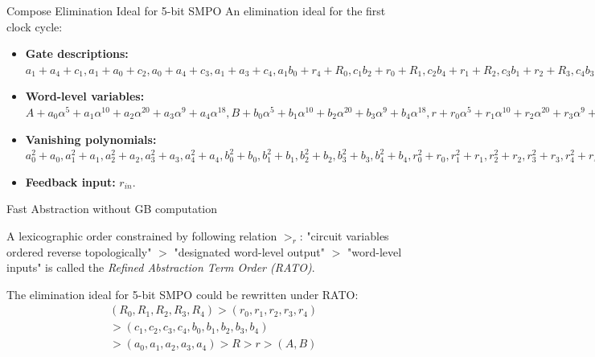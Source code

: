 \documentclass[xcolor=dvipsnames]{beamer}
\begin{document}
\begin{frame}{\large{Compose Elimination Ideal for 5-bit SMPO}}
An elimination ideal for the first clock cycle:
\begin{itemize}
\item {\bf Gate descriptions:}
$a_1+a_4+c_1, a_1+a_0+c_2, a_0+a_4+c_3, a_1+a_3+c_4,
		  a_1b_0+r_4+R_0, c_1b_2+r_0+R_1, c_2b_4+r_1+R_2, c_3b_1+r_2+R_3, c_4b_3+r_3+R_4;$
		  
\item {\bf Word-level variables:}
$A+a_0\alpha^5+a_1\alpha^{10}+a_2\alpha^{20}+a_3\alpha^9+a_4\alpha^{18},
		  B+b_0\alpha^5+b_1\alpha^{10}+b_2\alpha^{20}+b_3\alpha^9+b_4\alpha^{18},
		  r+r_0\alpha^5+r_1\alpha^{10}+r_2\alpha^{20}+r_3\alpha^9+r_4\alpha^{18},
		  R+R_0\alpha^5+R_1\alpha^{10}+R_2\alpha^{20}+R_3\alpha^9+R_4\alpha^{18};$
		  
\item {\bf Vanishing polynomials:}
		 $ a_0^2+a_0, a_1^2+a_1, a_2^2+a_2, a_3^2+a_3, a_4^2+a_4,
		  b_0^2+b_0, b_1^2+b_1, b_2^2+b_2, b_3^2+b_3, b_4^2+b_4,
		  r_0^2+r_0, r_1^2+r_1, r_2^2+r_2, r_3^2+r_3, r_4^2+r_4,
		  R_0^2+R_0, R_1^2+R_1, R_2^2+R_2, R_3^2+R_3, R_4^2+R_4,
		  c_1^2+c_1, c_2^2+c_2, c_3^2+c_3, c_4^2+c_4,
		  A^{32}+A, B^{32}+B, r^{32}+r, R^{32}+R;$
		  
\item	{\bf Feedback input:}	  $r_{in}$.
\end{itemize}
\end{frame}

\begin{frame}{\large{Fast Abstraction without GB computation}}
\begin{Definition}
A lexicographic order constrained by following relation $>_{r}$: "circuit variables ordered reverse topologically" $>$ 
"designated word-level output" $>$ "word-level inputs" is called the \emph{Refined Abstraction Term Order (RATO)}.
\end{Definition}
\begin{Example}
The elimination ideal for 5-bit SMPO could be rewritten under RATO:
\begin{align}
&(R_0,R_1,R_2,R_3,R_4)>(r_0,r_1,r_2,r_3,r_4)\nonumber\\&>(c_1,c_2,c_3,c_4,b_0,b_1,b_2,b_3,b_4)\nonumber\\
&>(a_0,a_1,a_2,a_3,a_4)>R>r>(A,B)\nonumber
\end{align}
\end{Example}
\end{frame}
\end{document}
